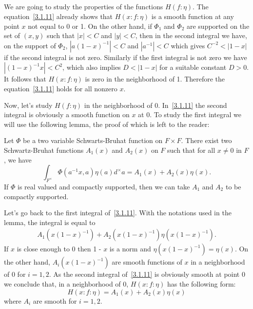 \subsection{}
We are going to study the properties of the functions $H(f:\eta)$.
The equation~\eqref{3.1.11} already shows that $H(x:f:\eta)$ is a smooth function at any point $x$ not equal to 0 or 1.
On the other hand, if $\Phi_1$ and $\Phi_2$ are supported on the set of $(x, y)$ such that $|x| < C$ and $|y| < C$, then in the second integral we have, on the support of $\Phi_2$, $|a(1-x)^{-1}| < C$ and $|a^{-1}| <C$ which gives $C^{-2} < |1-x|$ if the second integral is not zero.
Similarly if the first integral is not zero we have $|(1-x)^{-1}x| < C^2$, which also implies $D < |1 - x|$ for a suitable constant $D > 0$.
It follows that $H(x:f:\eta)$ is zero in the neighborhood of 1.
Therefore the equation~\eqref{3.1.11} holds for all nonzero $x$.

Now, let's study $H(f:\eta)$ in the neighborhood of 0.
In~\eqref{3.1.11} the second integral is obviously a smooth function on $x$ at 0.
To study the first integral we will use the following lemma, the proof of which is left to the reader:
\begin{lemma}\label{lem:3.2}
    Let $\Phi$ be a two variable Schwarts-Bruhat function on $F \times F$.
    There exist two Schwartz-Bruhat functions $A_1(x)$ and $A_2(x)$ on $F$  such that for all $x \neq 0$ in $F$, we have
    \[
    \int_{F^\times} \Phi(a^{-1}x, a)\eta(a) d^\times a = A_1(x) + A_2(x) \eta(x).
    \]
    If $\Phi$ is real valued and compactly supported, then we can take $A_1$ and $A_2$ to be compactly supported.
\end{lemma}

Let's go back to the first integral of~\eqref{3.1.11}.
With the notations used in the lemma, the integral is equal to
\begin{align}
    A_1(x(1-x)^{-1}) + A_2(x(1-x)^{-1})\eta(x(1-x)^{-1}).
\end{align}
If $x$ is close enough to 0 then 1 - $x$ is a norm and $\eta(x(1-x)^{-1}) = \eta(x)$.
On the other hand, $A_i(x(1-x)^{-1})$ are smooth functions of $x$ in a neighborhood of 0 for $i = 1,2$.
As the second integral of~\eqref{3.1.11} is obviously smooth at point 0 we conclude that, in a neighborhood of 0, $H(x:f:\eta)$ has the following form:
\begin{equation}
    H(x:f:\eta) = A_1(x) + A_2(x) \eta(x)
\end{equation}
where $A_i$ are smooth for $i = 1, 2$.


